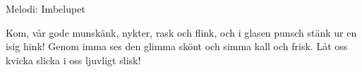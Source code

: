 \begin{song}

\begin{songmeta}
Melodi: Imbelupet
\end{songmeta}

\begin{songtext}
Kom, vår gode munskänk, nykter, rask och flink,
och i glasen punsch stänk ur en isig hink!
Genom imma ses den glimma
skönt och simma kall och frisk.
Låt oss kvicka slicka i oss ljuvligt slisk!
\end{songtext}
\end{song}
